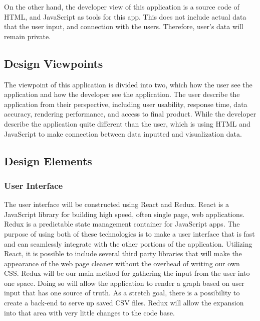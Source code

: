 \documentclass[journal,10pt,onecolumn,compsoc]{IEEEtran} \usepackage[margin=1.0in]{geometry} \usepackage{pdfpages}
\begin{document}
    \noindent On the other hand, the developer view of this application is a source code of HTML, and JavaScript as tools for this app. This does not include actual data that the user input, and connection with the users. Therefore, user's data will remain private.
    \subsection{Design Viewpoints}
    The viewpoint of this application is divided into two, which how the user see the application and how the developer see the application. The user describe the application from their perspective, including user usability, response time, data accuracy, rendering performance, and access to final product. While the developer describe the application quite different than the user, which is using HTML and JavaScript to make connection between data inputted and visualization data. 
    \subsection{Design Elements}
        \subsubsection{User Interface}
        The user interface will be constructed using React and Redux.  React is a JavaScript library for building high speed, often single page, web applications. Redux is a predictable state management container for JavaScript apps.
        The purpose of using both of these technologies is to make a user interface that is fast and can seamlessly integrate with the other portions of the application. Utilizing React, it is possible to include several third party libraries that will make the appearance of the web page cleaner without the overhead of writing our own CSS. Redux will be our main method for gathering the input from the user into one space. Doing so will allow the application to render a graph based on user input that has one source of truth. As a stretch goal, there is a possibility to create a back-end to serve up saved CSV files. Redux will allow the expansion into that area with very little changes to the code base.
        
\end{document}
